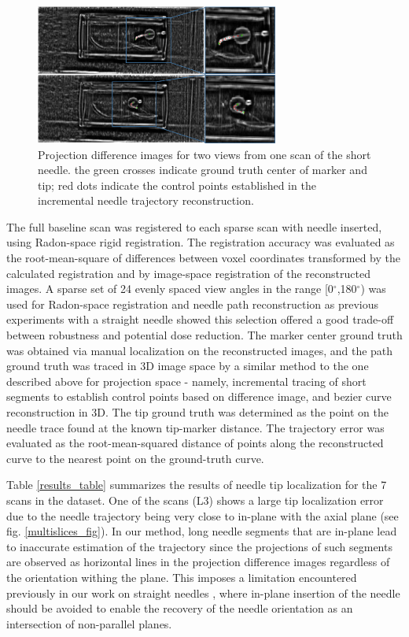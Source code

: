 \documentclass[letterpaper, 11 pt, conference]{ieeeconf}  %
\begin{document}
\begin{figure}[b]
\centering
\includegraphics[width=8cm]{projection_diff_images.png}
\caption{Projection difference images for two views from one scan of the short needle. the green crosses indicate ground truth center of marker and tip; red dots indicate the control points established in the incremental needle trajectory reconstruction.}
\label{proj_diff_fig}
\end{figure}

The full baseline scan was registered to each sparse scan with needle inserted, using Radon-space rigid registration. The registration accuracy was evaluated as the root-mean-square of differences between voxel coordinates transformed by the calculated registration and by image-space registration of the reconstructed images. 
A sparse set of 24 evenly spaced view angles in the range [0$^\circ$,180$^\circ$) was used for Radon-space registration and needle path reconstruction as previous experiments \cite{medan2017reduced} with a straight needle showed this selection offered a good trade-off between robustness and potential dose reduction.
The marker center ground truth was obtained via manual localization on the reconstructed images, and the path ground truth was traced in 3D image space by a similar method to the one described above for projection space - namely, incremental tracing of short segments to establish control points based on difference image, and bezier curve reconstruction in 3D. The tip ground truth was determined as the point on the needle trace found at the known tip-marker distance. The trajectory error was evaluated as the root-mean-squared distance of points along the reconstructed curve to the nearest point on the ground-truth curve.

Table \ref{results_table} summarizes the results of needle tip localization for the 7 scans in the dataset. One of the scans (L3) shows a large tip localization error due to the needle trajectory being very close to in-plane with the axial plane (see fig. \ref{multislices_fig}). In our method, long needle segments that are in-plane lead to inaccurate estimation of the trajectory since the projections of such segments are observed as horizontal lines in the projection difference images regardless of the orientation withing the plane. This imposes a limitation encountered previously in our work on straight needles \cite{medan2017reduced}, where in-plane insertion of the needle should be avoided to enable the recovery of the needle orientation as an intersection of non-parallel planes.
\end{document}
